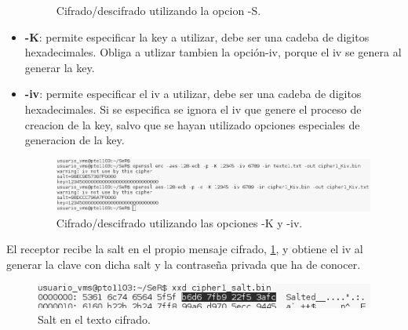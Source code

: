 \documentclass[11pt]{article}
\begin{document}
\begin{itemize}
\begin{figure}[!ht]
                \caption{Cifrado/descifrado utilizando la opcion -S.}
              \end{figure}
        \item \textbf{-K}: permite especificar la key a utilizar, debe ser una cadeba de digitos hexadecimales. Obliga a utlizar tambien la opción-iv, porque el iv se genera al generar la key.
        \item \textbf{-iv}: permite especificar el iv a utilizar, debe ser una cadeba de digitos hexadecimales. Si se especifica se ignora el iv que genere el proceso de creacion de la key, salvo que se hayan utilizado opciones especiales de generacion de la key.
              \begin{figure}[!ht]
                \centering
                \includegraphics[width = .9\textwidth]{cipher_Kiv}
                \caption{Cifrado/descifrado utilizando las opciones -K y -iv.}
              \end{figure}
      \end{itemize}

      \par
      El receptor recibe la salt en el propio mensaje cifrado, \cref{fig:salt}, y obtiene el iv al generar la clave con dicha salt y la contraseña privada que ha de conocer.
      \begin{figure}[!ht]
        \centering
        \includegraphics[width = .9\textwidth]{salt}
        \caption{Salt en el texto cifrado.}
        \label{fig:salt}
      \end{figure}
\end{document}

